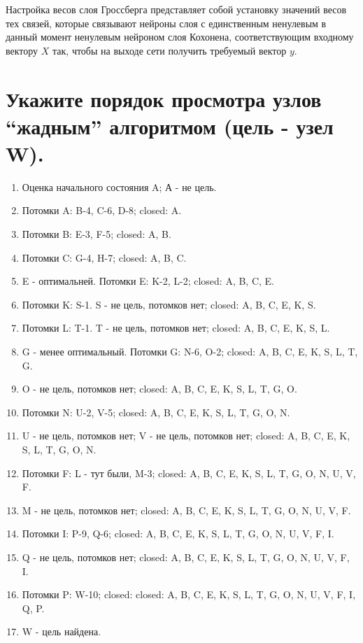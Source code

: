 \documentclass[12pt,a4paper]{article}
\begin{document}
Настройка весов слоя Гроссберга представляет собой установку значений весов
тех связей, которые связывают нейроны слоя с единственным ненулевым в данный
момент ненулевым нейроном слоя Кохонена, соответствующим входному вектору $X$ так,
чтобы на выходе сети получить требуемый вектор $y$.

\section{Укажите порядок просмотра узлов ``жадным'' алгоритмом (цель - узел W).}


\begin{enumerate}
    \item Оценка начального состояния A; А - не цель.
    \item Потомки A: B-4, C-6, D-8; closed: A.
    \item Потомки B: E-3, F-5; closed: A, B.
    \item Потомки C: G-4, H-7; closed: A, B, C.
    \item E - оптимальней. Потомки E: K-2, L-2; closed: A, B, C, E.
    \item Потомки K: S-1. S - не цель, потомков нет; closed: A, B, C, E, K, S.
    \item Потомки L: T-1. T - не цель, потомков нет; closed: A, B, C, E, K, S, L.
    \item G - менее оптимальный. Потомки G: N-6, O-2; closed: A, B, C, E, K, S, L, T, G.
    \item O - не цель, потомков нет; closed: A, B, C, E, K, S, L, T, G, O.
    \item Потомки N: U-2, V-5; closed: A, B, C, E, K, S, L, T, G, O, N.
    \item U - не цель, потомков нет; V - не цель, потомков нет; closed: A, B, C, E, K, S, L, T, G, O, N.
    \item Потомки F: L - тут были, M-3; closed: A, B, C, E, K, S, L, T, G, O, N, U, V, F.
    \item M - не цель, потомков нет; closed: A, B, C, E, K, S, L, T, G, O, N, U, V, F.
    \item Потомки I: P-9, Q-6; closed: A, B, C, E, K, S, L, T, G, O, N, U, V, F, I.
    \item Q - не цель, потомков нет; closed: A, B, C, E, K, S, L, T, G, O, N, U, V, F, I.
    \item Потомки P: W-10; closed: closed: A, B, C, E, K, S, L, T, G, O, N, U, V, F, I, Q, P.
    \item W - цель найдена.
\end{enumerate}
\end{document}
